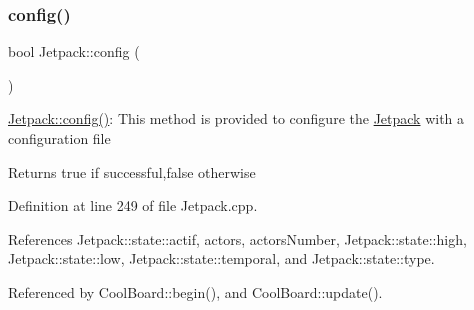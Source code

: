 \subsubsection{\texorpdfstring{config()}{config()}}
{\footnotesize\ttfamily bool Jetpack\+::config (\begin{DoxyParamCaption}{ }\end{DoxyParamCaption})}

\hyperlink{classJetpack_ab065ee83e244265a2223a22f3ee4a719}{Jetpack\+::config()}\+: This method is provided to configure the \hyperlink{classJetpack}{Jetpack} with a configuration file

\begin{DoxyReturn}{Returns}
true if successful,false otherwise 
\end{DoxyReturn}


Definition at line 249 of file Jetpack.\+cpp.



References Jetpack\+::state\+::actif, actors, actors\+Number, Jetpack\+::state\+::high, Jetpack\+::state\+::low, Jetpack\+::state\+::temporal, and Jetpack\+::state\+::type.



Referenced by Cool\+Board\+::begin(), and Cool\+Board\+::update().


